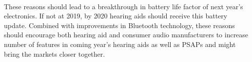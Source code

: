 \paragraph{}
These reasons should lead to a breakthrough in battery life factor of next year's electronics. If not at 2019, by 2020 hearing aids should receive this battery update. Combined with improvements in Bluetooth technology, these reasons should encourage both hearing aid and consumer audio manufacturers to increase number of features in coming year's hearing aids as well as PSAPs and might bring the markets closer together. 
   



